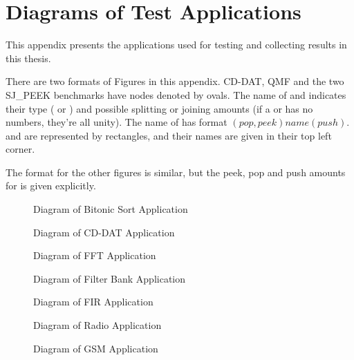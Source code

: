 \section{Diagrams of Test Applications}
\label{apx:apps}

This appendix presents the applications used for testing and
collecting results in this thesis.

There are two formats of Figures in this appendix. CD-DAT, QMF and
the two SJ\_PEEK benchmarks have nodes denoted by ovals. The name
of {\splitters} and {\joiners} indicates their type ({\duplicate} or
{\roundrobin}) and possible splitting or joining amounts (if a
{\roundrobin} {\splitter} or {\joiner} has no numbers, they're all
unity). The name of {\filters} has format $(pop, peek) name (push)$.
{\pipelines} and {\splitjoins} are represented by rectangles, and
their names are given in their top left corner.

The format for the other figures is similar, but the peek, pop and
push amounts for {\filters} is given explicitly.

\begin{figure}
\centering {} \caption{Diagram
of Bitonic Sort Application}
\end{figure}

\begin{figure}
\centering {} \caption{Diagram
of CD-DAT Application}
\end{figure}

\begin{figure}
\centering {} \caption{Diagram of
FFT Application}
\end{figure}

\begin{figure}
\centering {}
\caption{Diagram of Filter Bank Application}
\end{figure}

\begin{figure}
\centering {} \caption{Diagram of
FIR Application}
\end{figure}

\begin{figure}
\centering {} \caption{Diagram of
Radio Application}
\end{figure}

\begin{figure}
\centering {} \caption{Diagram of
GSM Application}
\end{figure}

